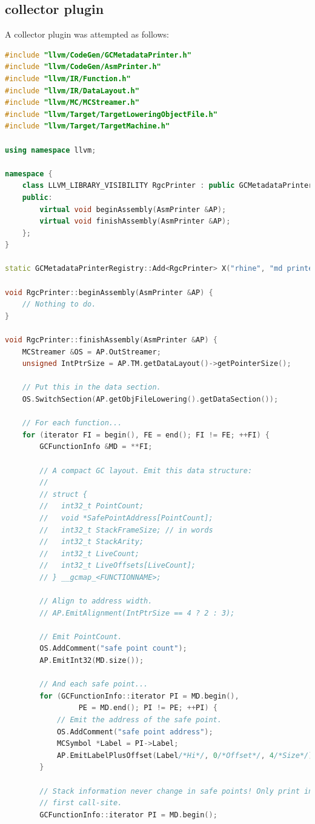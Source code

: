 \documentclass{article}
\begin{document}
\subsection{collector plugin}
A collector plugin was attempted as follows:
\begin{lstlisting}[language=c++]
#include "llvm/CodeGen/GCMetadataPrinter.h"
#include "llvm/CodeGen/AsmPrinter.h"
#include "llvm/IR/Function.h"
#include "llvm/IR/DataLayout.h"
#include "llvm/MC/MCStreamer.h"
#include "llvm/Target/TargetLoweringObjectFile.h"
#include "llvm/Target/TargetMachine.h"

using namespace llvm;

namespace {
	class LLVM_LIBRARY_VISIBILITY RgcPrinter : public GCMetadataPrinter {
	public:
		virtual void beginAssembly(AsmPrinter &AP);
		virtual void finishAssembly(AsmPrinter &AP);
	};
}

static GCMetadataPrinterRegistry::Add<RgcPrinter> X("rhine", "md printer");

void RgcPrinter::beginAssembly(AsmPrinter &AP) {
	// Nothing to do.
}

void RgcPrinter::finishAssembly(AsmPrinter &AP) {
	MCStreamer &OS = AP.OutStreamer;
	unsigned IntPtrSize = AP.TM.getDataLayout()->getPointerSize();

	// Put this in the data section.
	OS.SwitchSection(AP.getObjFileLowering().getDataSection());

	// For each function...
	for (iterator FI = begin(), FE = end(); FI != FE; ++FI) {
		GCFunctionInfo &MD = **FI;

		// A compact GC layout. Emit this data structure:
		//
		// struct {
		//   int32_t PointCount;
		//   void *SafePointAddress[PointCount];
		//   int32_t StackFrameSize; // in words
		//   int32_t StackArity;
		//   int32_t LiveCount;
		//   int32_t LiveOffsets[LiveCount];
		// } __gcmap_<FUNCTIONNAME>;

		// Align to address width.
		// AP.EmitAlignment(IntPtrSize == 4 ? 2 : 3);

		// Emit PointCount.
		OS.AddComment("safe point count");
		AP.EmitInt32(MD.size());

		// And each safe point...
		for (GCFunctionInfo::iterator PI = MD.begin(),
			     PE = MD.end(); PI != PE; ++PI) {
			// Emit the address of the safe point.
			OS.AddComment("safe point address");
			MCSymbol *Label = PI->Label;
			AP.EmitLabelPlusOffset(Label/*Hi*/, 0/*Offset*/, 4/*Size*/);
		}

		// Stack information never change in safe points! Only print info from the
		// first call-site.
		GCFunctionInfo::iterator PI = MD.begin();


\end{lstlisting}
\end{document}

